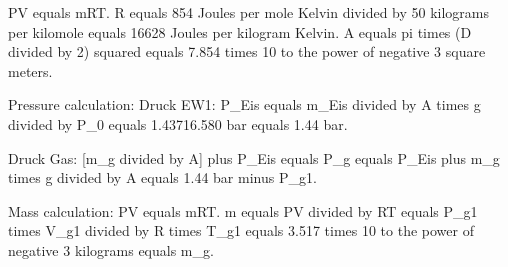 PV equals mRT.  
R equals 854 Joules per mole Kelvin divided by 50 kilograms per kilomole equals 16628 Joules per kilogram Kelvin.  
A equals pi times (D divided by 2) squared equals 7.854 times 10 to the power of negative 3 square meters.  

Pressure calculation:  
Druck EW1:  
P_Eis equals m_Eis divided by A times g divided by P_0 equals 1.43716.580 bar equals 1.44 bar.  

Druck Gas:  
[m_g divided by A] plus P_Eis equals P_g equals P_Eis plus m_g times g divided by A equals 1.44 bar minus P_g1.  

Mass calculation:  
PV equals mRT.  
m equals PV divided by RT equals P_g1 times V_g1 divided by R times T_g1 equals 3.517 times 10 to the power of negative 3 kilograms equals m_g.